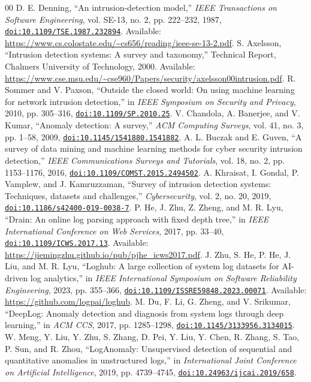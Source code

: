 \documentclass[conference]{IEEEtran}
\newcommand{\doiurl}[1]{\href{https://doi.org/#1}{\nolinkurl{doi:#1}}}
\begin{document}
\balance
\begin{thebibliography}{00}
 D. E. Denning, ``An intrusion-detection model,'' \emph{IEEE Transactions on Software Engineering}, vol. SE-13, no. 2, pp. 222--232, 1987, \doiurl{10.1109/TSE.1987.232894}. Available: \url{https://www.cs.colostate.edu/~cs656/reading/ieee-se-13-2.pdf}.
 S. Axelsson, ``Intrusion detection systems: A survey and taxonomy,'' Technical Report, Chalmers University of Technology, 2000. Available: \url{https://www.cse.msu.edu/~cse960/Papers/security/axelsson00intrusion.pdf}.
 R. Sommer and V. Paxson, ``Outside the closed world: On using machine learning for network intrusion detection,'' in \emph{IEEE Symposium on Security and Privacy}, 2010, pp. 305--316, \doiurl{10.1109/SP.2010.25}.
 V. Chandola, A. Banerjee, and V. Kumar, ``Anomaly detection: A survey,'' \emph{ACM Computing Surveys}, vol. 41, no. 3, pp. 1--58, 2009, \doiurl{10.1145/1541880.1541882}.
 A. L. Buczak and E. Guven, ``A survey of data mining and machine learning methods for cyber security intrusion detection,'' \emph{IEEE Communications Surveys and Tutorials}, vol. 18, no. 2, pp. 1153--1176, 2016, \doiurl{10.1109/COMST.2015.2494502}.
 A. Khraisat, I. Gondal, P. Vamplew, and J. Kamruzzaman, ``Survey of intrusion detection systems: Techniques, datasets and challenges,'' \emph{Cybersecurity}, vol. 2, no. 20, 2019, \doiurl{10.1186/s42400-019-0038-7}.
 P. He, J. Zhu, Z. Zheng, and M. R. Lyu, ``Drain: An online log parsing approach with fixed depth tree,'' in \emph{IEEE International Conference on Web Services}, 2017, pp. 33--40, \doiurl{10.1109/ICWS.2017.13}. Available: \url{https://jiemingzhu.github.io/pub/pjhe_icws2017.pdf}.
 J. Zhu, S. He, P. He, J. Liu, and M. R. Lyu, ``Loghub: A large collection of system log datasets for AI-driven log analytics,'' in \emph{IEEE International Symposium on Software Reliability Engineering}, 2023, pp. 355--366, \doiurl{10.1109/ISSRE59848.2023.00071}. Available: \url{https://github.com/logpai/loghub}.
 M. Du, F. Li, G. Zheng, and V. Srikumar, ``DeepLog: Anomaly detection and diagnosis from system logs through deep learning,'' in \emph{ACM CCS}, 2017, pp. 1285--1298, \doiurl{10.1145/3133956.3134015}.
 W. Meng, Y. Liu, Y. Zhu, S. Zhang, D. Pei, Y. Liu, Y. Chen, R. Zhang, S. Tao, P. Sun, and R. Zhou, ``LogAnomaly: Unsupervised detection of sequential and quantitative anomalies in unstructured logs,'' in \emph{International Joint Conference on Artificial Intelligence}, 2019, pp. 4739--4745, \doiurl{10.24963/ijcai.2019/658}.

\end{thebibliography}
\end{document}
